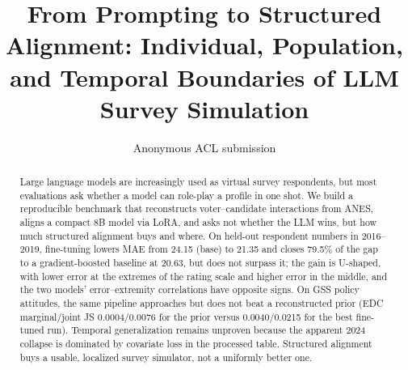 \documentclass[11pt]{article}
\title{From Prompting to Structured Alignment: Individual, Population, and Temporal Boundaries of LLM Survey Simulation}
\author{Anonymous ACL submission}
\begin{document}
\maketitle

\begin{abstract}
Large language models are increasingly used as virtual survey respondents, but
most evaluations ask whether a model can role-play a profile in one shot. We
build a reproducible benchmark that reconstructs voter--candidate interactions
from ANES, aligns a compact 8B model via LoRA, and asks not whether the LLM wins,
but how much structured alignment buys and where. On held-out respondent
numbers in 2016--2019, fine-tuning lowers MAE from 24.15 (base) to 21.35 and
closes 79.5\% of the gap to a gradient-boosted baseline at 20.63, but does not
surpass it; the gain is U-shaped, with lower error at the extremes of the rating
scale and higher error in the middle, and the two models' error--extremity
correlations have opposite signs. On GSS policy attitudes, the same pipeline
approaches but does not beat a reconstructed prior (EDC marginal/joint JS
0.0004/0.0076 for the prior versus 0.0040/0.0215 for the best fine-tuned run).
Temporal generalization remains unproven because the apparent 2024 collapse is
dominated by covariate loss in the processed table. Structured alignment buys a
usable, localized survey simulator, not a uniformly better one.
\end{abstract}




\end{document}
